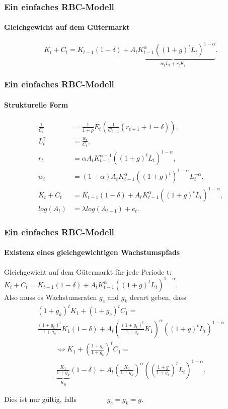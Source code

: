 \documentclass[10pt]{beamer}  %
\begin{document}
\begin{frame} \frametitle{Ein einfaches RBC-Modell}
  \framesubtitle{Gleichgewicht auf dem G\"{u}termarkt}
  \[
  K_t+C_t = K_{t-1}(1-\delta)+\underbrace{A_tK_{t-1}^\alpha\left( \left( 1+g\right) ^{t}L_t\right)^{1-\alpha}}_{w_t L_t + r_t K_t}.
  \]
\end{frame}



\begin{frame} \frametitle{Ein einfaches RBC-Modell}
  \framesubtitle{Strukturelle Form}
  \begin{align*}
    \frac{1}{C_t}&=\frac{1}{1+\rho}E_t\left(\frac{1}{C_{t+1}}(r_{t+1}+1-\delta)\right),\\
    L_t^\gamma&=\frac{w_t}{C_t},\\
    r_t &= \alpha A_tK_{t-1}^{\alpha-1}\left( \left( 1+g\right) ^{t}L_t\right)^{1-\alpha},\\
    w_t &= (1-\alpha) A_tK_{t-1}^\alpha\left( \left( 1+g\right) ^{t}\right)^{1-\alpha}L_t^{-\alpha},\\
    K_t+C_t &= K_{t-1}(1-\delta)+A_tK_{t-1}^\alpha\left( \left( 1+g\right) ^{t}L_t\right)^{1-\alpha},\\
        log(A_{t})&=\lambda log(A_{t-1}) + e_{t}.
  \end{align*}
\end{frame}


\begin{frame}\frametitle{Ein einfaches RBC-Modell}
  \framesubtitle{Existenz eines gleichgewichtigen Wachstumspfads}
Gleichgewicht auf dem G\"{u}termarkt f\"{u}r jede Periode t: $ K_t+C_t = K_{t-1}(1-\delta)+A_tK_{t-1}^\alpha\left( \left( 1+g\right) ^{t}L_t\right)^{1-\alpha}$.\\
Also muss es Wachstumsraten $g_c$ and $g_k$ derart geben, dass
\begin{multline*}
(1+g_k)^tK_1 + (1+g_c)^tC_1 =\\
 \frac{(1+g_k)^t}{1+g_k}K_1(1-\delta) + A_t\left(\frac{(1+g_k)^t}{1+g_k}K_1\right)^\alpha\left( \left( 1+g\right) ^{t}L_t\right)^{1-\alpha}
\end{multline*}
\begin{multline*}
\Leftrightarrow K_1 + \left(\frac{1+g_c}{1+g_k}\right)^tC_1 =\\
 \underbrace{\frac{K_1}{1+g_k}}_{K_0} (1-\delta) + A_t\left(\frac{K_1}{1+g_k}\right)^\alpha\left( \left( \frac{1+g}{1+g_k}\right) ^{t}L_t\right)^{1-\alpha}.
\end{multline*}

Dies ist nur g\"{u}ltig, falls $\qquad\qquad g_c=g_k=g$.

\end{frame}
\end{document}
